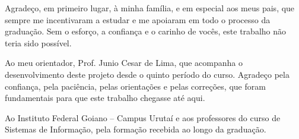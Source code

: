 \begin{agradecimentos}
Agradeço, em primeiro lugar, à minha família, e em especial aos meus pais, que sempre me incentivaram a estudar e me apoiaram em todo o processo da graduação. Sem o esforço, a confiança e o carinho de vocês, este trabalho não teria sido possível.

Ao meu orientador, Prof. Junio Cesar de Lima, que acompanha o desenvolvimento deste projeto desde o quinto período do curso. Agradeço pela confiança, pela paciência, pelas orientações e pelas correções, que foram fundamentais para que este trabalho chegasse até aqui.

Ao Instituto Federal Goiano – Campus Urutaí e aos professores do curso de Sistemas de Informação, pela formação recebida ao longo da graduação.

\end{agradecimentos}
